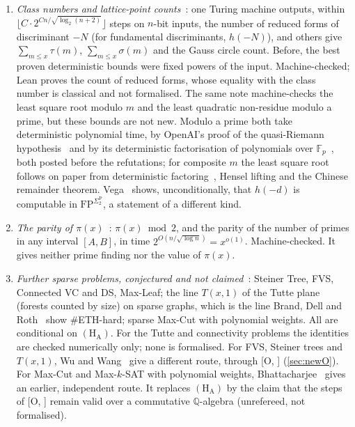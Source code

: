 \documentclass[10pt]{amsart}
\theoremstyle{plain}
\theoremstyle{definition}
\theoremstyle{remark}
\numberwithin{equation}{section}
\newcommand{\Oa}[1][]{\textup{[O\if\relax\detokenize{#1}\relax\else, #1\fi]}}
\newcommand{\HA}{\ensuremath{(\mathrm{H}_{\mathrm{A}})}}
\begin{document}
\begin{enumerate}[label=\textup{(\roman*)},resume]
Before 2026 every proven deterministic bound had a fixed positive exponent, the best being
$N^{1/5+o(1)}$~\cite{Har21}. The rate $2^{O(n/\sqrt{\log n})}$ was proved in Lean in a public
repository~\cite{IF26} and on paper by Shunia~\cite{Shu26}, conditionally on two unrefereed
preprints. We give an independent second Lean proof, along a different route~\cite{TulsyanF26}:
one Turing machine outputs the least prime factor of $N$ within
$\lfloor C\cdot2^{Cn/\sqrt{\log_2(n+2)}}\rfloor$ steps, by evaluating a two-dimensional
Sch\"onhage--Strassen multiplication network with Anthropic's counting theorem. Machine-checked.
\item \emph{Class numbers and lattice-point counts}~\cite{TulsyanCN26}: one Turing machine outputs,
within $\lfloor C\cdot2^{Cn/\sqrt{\log_2(n+2)}}\rfloor$ steps on $n$-bit inputs, the number of reduced
forms of discriminant $-N$ (for fundamental discriminants, $h(-N)$), and others give
$\sum_{m\le x}\tau(m)$, $\sum_{m\le x}\sigma(m)$ and the Gauss circle count. Before, the best proven
deterministic bounds were fixed powers of the input. Machine-checked; Lean proves the count of
reduced forms, whose equality with the class number is classical and not formalised. The same note
machine-checks the least square root modulo $m$ and the least quadratic non-residue modulo a prime,
but these bounds are not new. Modulo a prime both take deterministic polynomial time, by OpenAI's
proof of the quasi-Riemann hypothesis~\cite[Cor.~1.2]{OAI003} and by its deterministic factorisation
of polynomials over $\mathbb{F}_p$~\cite{OAI142}, both posted before the refutations; for composite
$m$ the least square root follows on paper from deterministic factoring~\cite{Shu26}, Hensel lifting
and the Chinese remainder theorem. Vega~\cite{Vega26} shows, unconditionally, that $h(-d)$ is
computable in $\mathrm{FP}^{\Sigma_2^{\mathrm P}}$, a statement of a different kind.
\item \emph{The parity of $\pi(x)$}~\cite{TulsyanP26}: $\pi(x)\bmod2$, and the parity of the number
of primes in any interval $[A,B]$, in time $2^{O(n/\sqrt{\log n})}=x^{o(1)}$. Machine-checked. It
gives neither prime finding nor the value of $\pi(x)$.
\item \emph{Further sparse problems, conjectured and not claimed}~\cite{TulsyanRepo26}: Steiner
Tree, FVS, Connected VC and DS, Max-Leaf; the line $T(x,1)$ of the Tutte plane (forests counted by
size) on sparse graphs, which is the line Brand, Dell and Roth~\cite{BrandDellRoth19} show
$\#$ETH-hard; sparse Max-Cut with polynomial weights. All are conditional on \HA. For the Tutte
and connectivity problems the identities are checked numerically only; none is formalised. For
FVS, Steiner trees and $T(x,1)$, Wu and Wang~\cite{WW26f} give a different route, through \Oa{}
(\cref{sec:newO}). For
Max-Cut and Max-$k$-SAT with polynomial weights, Bhattacharjee~\cite{Bhattacharjee26} gives an
earlier, independent route. It replaces \HA{} by the claim that the steps of \Oa{} remain valid
over a commutative $\mathbb{Q}$-algebra (unrefereed, not formalised).
\end{enumerate}
\end{document}
